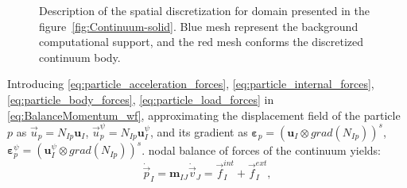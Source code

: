 \documentclass[preprint,12pt,a4paper]{elsarticle}
\newcommand{\vect}[1]{
  \ensuremath{\mathbf{{#1}}}
}
\newcommand{\tens}[1]{
  \ensuremath{\mathbf{{#1}}}
}
\newcommand\Grad[1]{grad({#1})}
\begin{document}
\begin{figure}\sidecaption
  \centering
  \caption{Description of the spatial discretization for domain presented in the
    figure~\ref{fig:Continuum-solid}. Blue mesh represent the
    background computational support, and the red mesh conforms the
    discretized continuum body.}
  \label{fig:MPM-discretization}
\end{figure}
Introducing \eqref{eq:particle_acceleration_forces},
\eqref{eq:particle_internal_forces}, \eqref{eq:particle_body_forces},  \eqref{eq:particle_load_forces} in \eqref{eq:BalanceMomentum_wf},
approximating the displacement field of the particle
$p$ as $\vec{u}_{p} = N_{Ip} \vect{u}_I$, $\vec{u}^{\psi}_{p} = N_{Ip} \vect{u}_I^{\psi}$,
and its gradient as $\tens{\varepsilon}_p = (\vect{u}_I \otimes
\Grad{N_{Ip}})^s$, $\tens{\varepsilon}_p^{\psi}= (\vect{u}_I^{\psi} \otimes \Grad{N_{Ip}})^s$.
nodal balance of forces of the continuum yields:
\begin{equation}
  \label{eq:particle_balance_forces3}
  \dot{\vec{p}}_{I}= \tens{m}_{IJ}\dot{\vec{v}}_{J} = \vec{f}_{I}^{int} + \vec{f}_{I}^{ext},
\end{equation}
\end{document}
